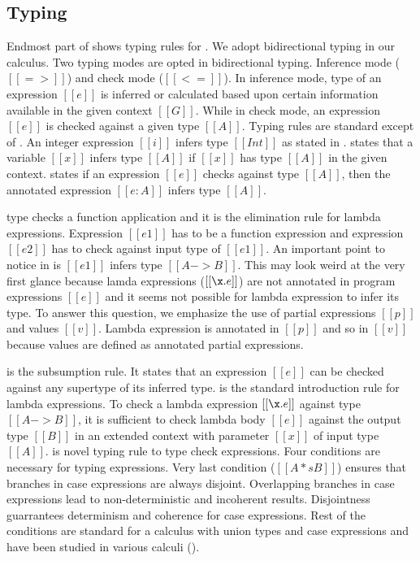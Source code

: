 \subsection{Typing}
\label{sec:union:typ}
Endmost part of  shows typing rules for \cal.
We adopt bidirectional typing in our calculus.
Two typing modes are opted in bidirectional typing. Inference mode ($[[=>]]$) and check mode ($[[<=]]$).
In inference mode, type of an expression $[[e]]$ is inferred or calculated based upon certain information
available in the given context $[[G]]$. 
While in check mode, an expression $[[e]]$ is checked against a given type $[[A]]$.
Typing rules are standard except of .
An integer expression $[[i]]$ infers type $[[Int]]$ as stated in .
 states that a variable $[[x]]$ infers type $[[A]]$ if $[[x]]$ has type $[[A]]$ in the 
given context.  states if an expression $[[e]]$ checks against type $[[A]]$, then the
annotated expression $[[e:A]]$ infers type $[[A]]$.

 type checks a function application and it is the elimination rule for lambda expressions.
Expression $[[e1]]$
has to be a function expression and expression $[[e2]]$ has to check against input type of $[[e1]]$.
An important point to notice in  is $[[e1]]$ infers type $[[A -> B]]$. This may look weird
at the very first glance because lamda expressions ($[[\x.e]]$) are not annotated in program expressions 
$[[e]]$ and it seems not possible for lambda expression to infer its type.
To answer this question, we emphasize the use of partial expressions $[[p]]$ and values $[[v]]$.
Lambda expression is annotated in $[[p]]$ and so in $[[v]]$ because values are defined as annotated
partial expressions.

 is the subsumption rule. It states that an expression $[[e]]$ can be checked 
against any supertype of its inferred type. 
 is the standard introduction rule for lambda expressions. To check a
lambda expression $[[\x.e]]$ against type $[[A -> B]]$, it is sufficient to check lambda body $[[e]]$
against the output type $[[B]]$ in an extended context with parameter $[[x]]$ of input type $[[A]]$.
 is novel typing rule to type check \typeof expressions. Four conditions are necessary
for typing \typeof expressions. Very last condition ($[[A *s B]]$) ensures that branches in case 
expressions are always disjoint. Overlapping branches in case expressions lead to non-deterministic
and incoherent results. Disjointness guarrantees determinism and coherence for case expressions.
Rest of the conditions are standard for a calculus with union types and case expressions and have been
studied in various calculi ().

